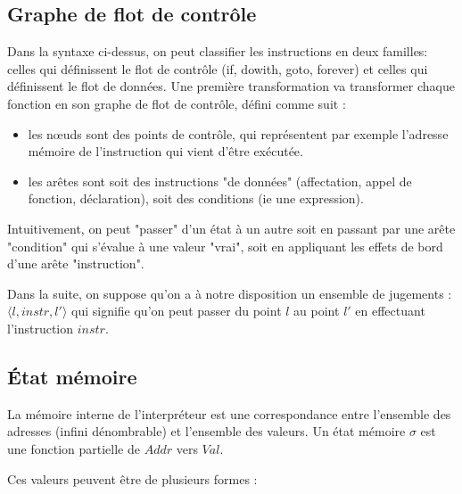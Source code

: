 \subsection{Graphe de flot de contrôle}
\label{sec:cfg}

Dans la syntaxe ci-dessus, on peut classifier les instructions en deux familles:
celles qui définissent le flot de contrôle (if, dowith, goto, forever) et celles
qui définissent le flot de données. Une première transformation va transformer
chaque fonction en son graphe de flot de contrôle, défini comme suit :

\begin{itemize}
\item
  les nœuds sont des points de contrôle, qui représentent par exemple
  l'adresse mémoire de l'instruction qui vient d'être exécutée.
\item
  les arêtes sont soit des instructions "de données" (affectation,
  appel de fonction, déclaration), soit des conditions (ie une
  expression).
\end{itemize}

\begin{minipage}{0.5\textwidth}

\end{minipage}
\begin{minipage}{0.5\textwidth}

\end{minipage}



Intuitivement, on peut "passer" d'un état à un autre soit en passant par une
arête "condition" qui s'évalue à une valeur "vrai", soit en appliquant les
effets de bord d'une arête "instruction".

Dans la suite, on suppose qu'on a à notre disposition un ensemble de jugements :
$\langle l, instr, l' \rangle$ qui signifie qu'on peut passer du point $l$ au
point $l'$ en effectuant l'instruction $instr$.

\subsection{État mémoire}
\label{sec:sigma}

La mémoire interne de l'interpréteur est une correspondance entre l'ensemble des
adresses (infini dénombrable) et l'ensemble des valeurs. Un état mémoire $σ$ est
une fonction partielle de $Addr$ vers $Val$.

Ces valeurs peuvent être de plusieurs formes :

